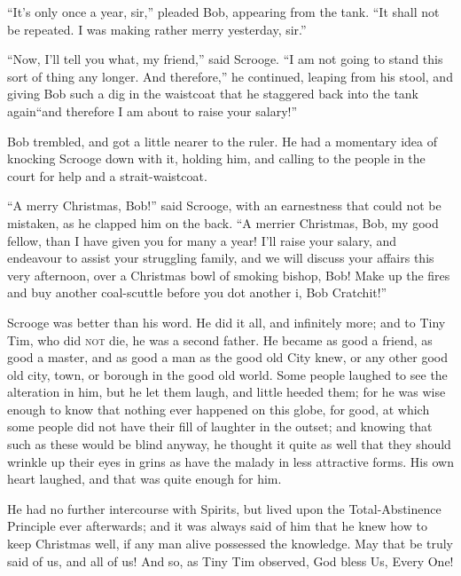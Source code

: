 \documentclass[paper=5.5in:8.5in,BCOR=7mm,twoside,DIV=calc,12pt,usegeometry]{scrbook} %
\begin{document}
\enquote{It's only once a year, sir,} pleaded Bob, appearing from the tank. \enquote{It shall not be repeated. I was making rather merry yesterday, sir.}

\enquote{Now, I'll tell you what, my friend,} said Scrooge. \enquote{I am not going to stand this sort of thing any longer. And therefore,} he continued, leaping from his stool, and giving Bob such a dig in the waistcoat that he staggered back into the tank again\textemdash \enquote{and therefore I am about to raise your salary!}

Bob trembled, and got a little nearer to the ruler. He had a momentary idea of knocking Scrooge down with it, holding him, and calling to the people in the court for help and a strait-waistcoat.

\enquote{A merry Christmas, Bob!} said Scrooge, with an earnestness that could not be mistaken, as he clapped him on the back. \enquote{A merrier Christmas, Bob, my good fellow, than I have given you for many a year! I'll raise your salary, and endeavour to assist your struggling family, and we will discuss your affairs this very afternoon, over a Christmas bowl of smoking bishop, Bob! Make up the fires and buy another coal-scuttle before you dot another i, Bob Cratchit!}

Scrooge was better than his word. He did it all, and infinitely more; and to Tiny Tim, who did \textsc{not} die, he was a second father. He became as good a friend, as good a master, and as good a man as the good old City knew, or any other good old city, town, or borough in the good old world. Some people laughed to see the alteration in him, but he let them laugh, and little heeded them; for he was wise enough to know that nothing ever happened on this globe, for good, at which some people did not have their fill of laughter in the outset; and knowing that such as these would be blind anyway, he thought it quite as well that they should wrinkle up their eyes in grins as have the malady in less attractive forms. His own heart laughed, and that was quite enough for him.

He had no further intercourse with Spirits, but lived upon the Total-Abstinence Principle ever afterwards; and it was always said of him that he knew how to keep Christmas well, if any man alive possessed the knowledge. May that be truly said of us, and all of us! And so, as Tiny Tim observed, God bless Us, Every One!

\end{document}
